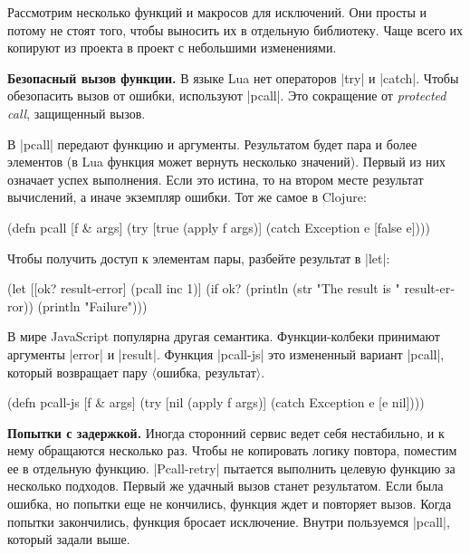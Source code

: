Рассмотрим несколько функций и макросов для исключений. Они просты и потому не
стоят того, чтобы выносить их в отдельную библиотеку. Чаще всего их копируют из
проекта в проект с небольшими изменениями.

\textbf{Безопасный вызов функции.} В языке Lua нет операторов \spverb|try| и
\spverb|catch|. Чтобы обезопасить вызов от ошибки, используют
\spverb|pcall|. Это сокращение от
\emph{protected call}, защищенный вызов.

В \spverb|pcall| передают функцию и аргументы. Результатом будет пара и более
элементов (в Lua функция может вернуть несколько значений). Первый из них
означает успех выполнения. Если это истина, то на втором месте результат
вычислений, а иначе экземпляр ошибки. Тот же самое в Clojure:

\begin{english}
  \begin{clojure}
(defn pcall [f & args]
  (try
    [true (apply f args)]
    (catch Exception e [false e])))
  \end{clojure}
\end{english}

Чтобы получить доступ к элементам пары, разбейте результат в \spverb|let|:

\begin{english}
  \begin{clojure}
(let [[ok? result-error] (pcall inc 1)]
  (if ok?
    (println (str "The result is " result-error))
    (println "Failure")))
  \end{clojure}
\end{english}

В мире JavaScript популярна другая семантика. Функции-колбеки принимают
аргументы \spverb|error| и \spverb|result|. Функция \spverb|pcall-js| это
измененный вариант \spverb|pcall|, который возвращает пару $\langle$ошибка,
результат$\rangle$.

\begin{english}
  \begin{clojure}
(defn pcall-js [f & args]
  (try
    [nil (apply f args)]
    (catch Exception e [e nil])))
  \end{clojure}
\end{english}

\textbf{Попытки с задержкой.} Иногда сторонний сервис ведет себя нестабильно, и
к нему обращаются несколько раз. Чтобы не копировать логику повтора, поместим ее
в отдельную функцию. \spverb|Pcall-retry| пытается выполнить целевую функцию за
несколько подходов. Первый же удачный вызов станет результатом. Если была
ошибка, но попытки еще не кончились, функция ждет и повторяет вызов. Когда
попытки закончились, функция бросает исключение. Внутри пользуемся
\spverb|pcall|, который задали выше.

